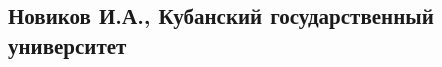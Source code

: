 \documentclass[a4paper, 14pt]{extarticle}
\author{\theauthor, \theinstitute}
\title{\thetitle}
\newcommand{\theauthor}{Новиков И.А.}
\newcommand{\theinstitute}{Кубанский государственный университет}
\begin{document}
  \subsection*{\theauthor, \theinstitute}

  \nocite{*}

  \begin{flushleft}
    
  \end{flushleft}
\end{document}

